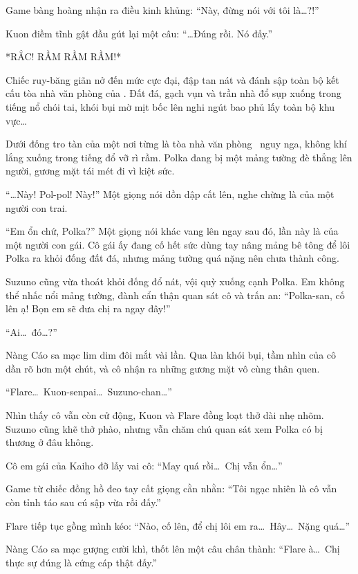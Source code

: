 \documentclass[../main.tex]{subfiles}
\begin{document}
Game bàng hoàng nhận ra điều kinh khủng: ``Này, đừng nói với tôi là\dots?!''

Kuon điềm tĩnh gật đầu gút lại một câu: ``\dots Đúng rồi. Nó đấy.''

*RẮC! RẦM RẦM RẦM!*

Chiếc ruy-băng giãn nở đến mức cực đại, đập tan nát và đánh sập toàn bộ kết cấu tòa nhà văn phòng của \hll. Đất đá, gạch vụn và trần nhà đổ sụp xuống trong tiếng nổ chói tai, khói bụi mờ mịt bốc lên nghi ngút bao phủ lấy toàn bộ khu vực\dots

\omk

Dưới đống tro tàn của một nơi từng là tòa nhà văn phòng \hll\ nguy nga, không khí lắng xuống trong tiếng đổ vỡ rì rầm. Polka đang bị một mảng tường đè thẳng lên người, gương mặt tái mét đi vì kiệt sức.

``\dots Này! Pol-pol! Này!'' Một giọng nói dồn dập cất lên, nghe chừng là của một người con trai.

``Em ổn chứ, Polka?'' Một giọng nói khác vang lên ngay sau đó, lần này là của một người con gái. Cô gái ấy đang cố hết sức dùng tay nâng mảng bê tông để lôi Polka ra khỏi đống đất đá, nhưng mảng tường quá nặng nên chưa thành công.

Suzuno cũng vừa thoát khỏi đống đổ nát, vội quỳ xuống cạnh Polka. Em không thể nhấc nổi mảng tường, đành cẩn thận quan sát cô và trấn an: ``Polka-san, cố lên ạ! Bọn em sẽ đưa chị ra ngay đây!''

``Ai\dots\ đó\dots?''

Nàng Cáo sa mạc lim dim đôi mắt vài lần. Qua làn khói bụi, tầm nhìn của cô dần rõ hơn một chút, và cô nhận ra những gương mặt vô cùng thân quen.

``Flare\dots\ Kuon-senpai\dots\ Suzuno-chan\dots''

Nhìn thấy cô vẫn còn cử động, Kuon và Flare đồng loạt thở dài nhẹ nhõm. Suzuno cũng khẽ thở phào, nhưng vẫn chăm chú quan sát xem Polka có bị thương ở đâu không.

Cô em gái của Kaiho đỡ lấy vai cô: ``May quá rồi\dots\ Chị vẫn ổn\dots''

Game từ chiếc đồng hồ đeo tay cất giọng cằn nhằn: ``Tôi ngạc nhiên là cô vẫn còn tỉnh táo sau cú sập vừa rồi đấy.''

Flare tiếp tục gồng mình kéo: ``Nào, cố lên, để chị lôi em ra\dots\ Hây\dots\ Nặng quá\dots''

Nàng Cáo sa mạc gượng cười khì, thốt lên một câu chân thành: ``Flare à\dots\ Chị thực sự đúng là cứng cáp thật đấy.''
\end{document}
